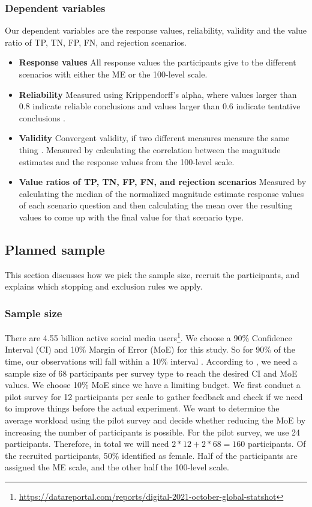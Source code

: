 \subsubsection{Dependent variables}
Our dependent variables are the response values, reliability, validity and the value ratio of TP, TN, FP, FN, and rejection scenarios.
%
\begin{itemize}
    \item \textbf{Response values} All response values the participants give to the different scenarios with either the ME or the 100-level scale.
    \item \textbf{Reliability} Measured using Krippendorff's alpha, where values larger than 0.8 indicate reliable conclusions and values larger than 0.6 indicate tentative conclusions \citep{krippendorff2004reliability}.
    \item \textbf{Validity} Convergent validity, if two different measures measure the same thing \citep{fitzner2007reliability}. Measured by calculating the correlation between the magnitude estimates and the response values from the 100-level scale.
    \item \textbf{Value ratios of TP, TN, FP, FN, and rejection scenarios} Measured by calculating the median of the normalized magnitude estimate response values of each scenario question and then calculating the mean over the resulting values to come up with the final value for that scenario type.
\end{itemize}

\subsection{Planned sample}
This section discusses how we pick the sample size, recruit the participants, and explains which stopping and exclusion rules we apply.

\subsubsection{Sample size}
There are 4.55 billion active social media users\footnote{\url{https://datareportal.com/reports/digital-2021-october-global-statshot}}.
%
We choose a 90\% Confidence Interval (CI) and 10\% Margin of Error (MoE) for this study.
%
So for 90\% of the time, our observations will fall within a 10\% interval \citep{olson2014ways}.
%
According to \citet{olson2014ways}, we need a sample size of 68 participants per survey type to reach the desired CI and MoE values.
%
We choose 10\% MoE since we have a limiting budget.
%
We first conduct a pilot survey for 12 participants per scale to gather feedback and check if we need to improve things before the actual experiment.
%
We want to determine the average workload using the pilot survey and decide whether reducing the MoE by increasing the number of participants is possible.
%
For the pilot survey, we use 24 participants.
%
Therefore, in total we will need $2*12+2*68 = 160$ participants.
%
Of the recruited participants, 50\% identified as female.
%
Half of the participants are assigned the ME scale, and the other half the 100-level scale.

